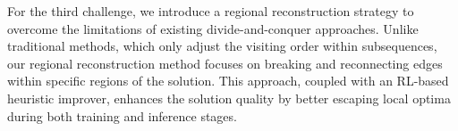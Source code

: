 For the third challenge, %
we introduce a regional reconstruction strategy to overcome the limitations of existing divide-and-conquer approaches. Unlike traditional methods, which only adjust the visiting order within subsequences, our regional reconstruction method focuses on breaking and reconnecting edges within specific regions of the solution. This approach, coupled with an RL-based heuristic improver, enhances the solution quality by better escaping local optima during both training and inference stages.

